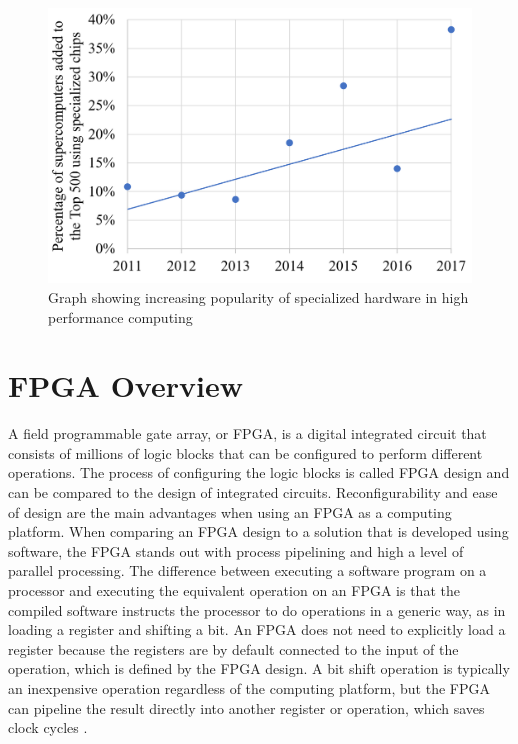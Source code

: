 \documentclass[12pt]{report}
\begin{document}
\begin{figure}
    \centering
    \includegraphics[scale=0.4]{figures/Supercomputers-with-pecialized-chips.png}
    \caption{Graph showing increasing popularity of 
specialized hardware in high performance computing \citep{GenPurpTech}}
    \label{fig:1}
\end{figure}

\section{FPGA Overview}
A field programmable gate array, or FPGA, is a digital integrated circuit that consists of millions of logic blocks that can be configured to perform different operations. The process of configuring the logic blocks is called FPGA design and can be compared to the design of integrated circuits. Reconfigurability and ease of design are the main advantages when using an FPGA as a computing platform. When comparing an FPGA design to a solution that is developed using software, the FPGA stands out with process pipelining and high a level of parallel processing. The difference between executing a software program on a processor and executing the equivalent operation on an FPGA is that the compiled software instructs the processor to do operations in a generic way, as in loading a register and shifting a bit. An FPGA does not need to explicitly load a register because the registers are by default connected to the input of the operation, which is defined by the FPGA design. A bit shift operation is typically an inexpensive operation regardless of the computing platform, but the FPGA can pipeline the result directly into another register or operation, which saves clock cycles \citep{XilFPGAIntro}.
  
\end{document}
